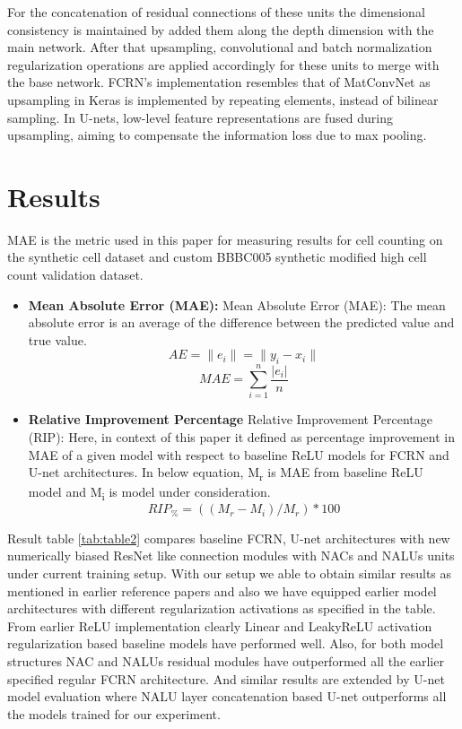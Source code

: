 \documentclass[conference]{IEEEtran}
\begin{document}
For the concatenation of residual connections of these units the dimensional consistency is maintained by added them along the depth dimension with the main network. After that upsampling, convolutional and batch normalization regularization operations are applied accordingly for these units to merge with the base network. FCRN’s implementation resembles that of MatConvNet \cite{b30} as upsampling in Keras is implemented by repeating elements, instead of bilinear sampling. In U-nets, low-level feature representations are fused during upsampling, aiming to compensate the information loss due to max pooling.

\section{Results}

MAE is the metric used in this paper for measuring results for cell counting on the synthetic cell dataset \cite{b29} and custom BBBC005 synthetic modified high cell count validation dataset.

\begin{itemize}
\item \textbf{Mean Absolute Error (MAE):}
Mean Absolute Error (MAE): The mean absolute error is an average of the difference between the predicted value and true value.
\begin{equation}
AE = \|e_i\| = \|y_i - x_i\|
\end{equation}
\begin{equation}
MAE = \sum_{i=1}^{n} \frac{|e_i|}{n}
\end{equation}
\end{itemize}

\begin{itemize}
\item \textbf{Relative Improvement  Percentage}
Relative Improvement  Percentage (RIP): Here, in context of this paper it defined as percentage improvement in MAE of a given model with respect to baseline ReLU models for FCRN and U-net architectures. In below equation, M\textsubscript{r} is MAE from baseline ReLU model and M\textsubscript{i} is model under consideration.
\begin{equation}
 RIP_\% = ((M_r - M_i) / M_r) * 100
\end{equation}

\end{itemize}

Result table \ref{tab:table2} compares baseline FCRN, U-net architectures with new numerically biased ResNet like  connection modules with NACs and NALUs units under current training setup. With our setup we able to obtain similar results as mentioned in earlier reference papers and also we have equipped earlier model architectures with different regularization activations as specified in the table. From earlier ReLU implementation clearly Linear and LeakyReLU activation regularization based baseline models have performed well. Also, for both model structures NAC and NALUs residual modules have outperformed all the earlier specified regular FCRN architecture. And similar results are extended by U-net model evaluation where NALU layer concatenation based U-net outperforms all the models trained for our experiment.
\end{document}
